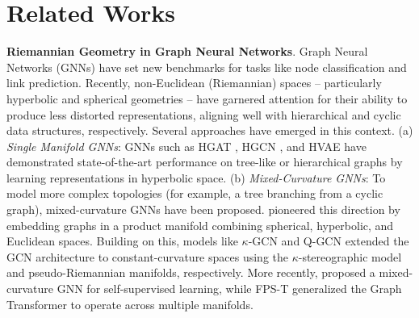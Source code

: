 \section{Related Works}
\vspace{-2mm}
\textbf{Riemannian Geometry in Graph Neural Networks}. Graph Neural Networks (GNNs) have set new benchmarks for tasks like node classification and link prediction. Recently, non-Euclidean (Riemannian) spaces -- particularly hyperbolic \citep{sala2018representation} and spherical \citep{liu2017sphereface, wilson2014spherical} geometries -- have garnered attention for their ability to produce less distorted representations, aligning well with hierarchical and cyclic data structures, respectively. Several approaches have emerged in this context. (a) \textit{Single Manifold GNNs}: GNNs such as HGAT \citep{zhang2021hyperbolic}, HGCN \citep{chami2019hyperbolic}, and HVAE \citep{sun2021hyperbolic} have demonstrated state-of-the-art performance on tree-like or hierarchical graphs by learning representations in hyperbolic space. (b) \textit{Mixed-Curvature GNNs}: To model more complex topologies (for example, a tree branching from a cyclic graph), mixed-curvature GNNs have been proposed. \cite{gu2019learning} pioneered this direction by embedding graphs in a product manifold combining spherical, hyperbolic, and Euclidean spaces. Building on this, models like $\kappa$-GCN \citep{bachmann2020constant} and Q-GCN \citep{xiong2022pseudo} extended the GCN architecture \citep{kipf2016semi} to constant-curvature spaces using the $\kappa$-stereographic model and pseudo-Riemannian manifolds, respectively. More recently, \cite{sun2022self} proposed a mixed-curvature GNN for self-supervised learning, while FPS-T \citep{cho2023curve} generalized the Graph Transformer \citep{min2022transformer} to operate across multiple manifolds.

